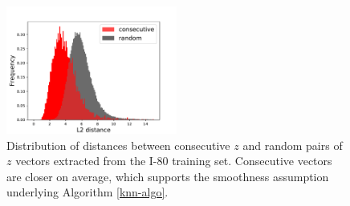 \documentclass{article}
\begin{document}

\begin{figure}
  \centering
  \includegraphics[width=0.5\textwidth]{images/distance_histograms.pdf}
  \caption{Distribution of distances between consecutive $z$ and random pairs of $z$ vectors extracted from the I-80 training set. Consecutive vectors are closer on average, which supports the smoothness assumption underlying Algorithm \ref{knn-algo}.}
\end{figure}



%




%
%
\end{document}
